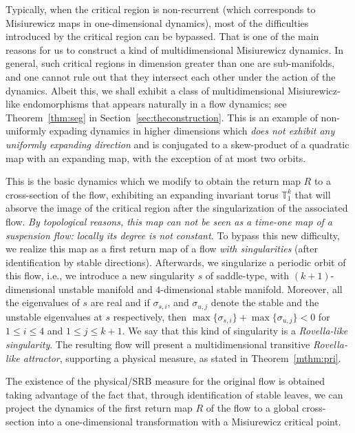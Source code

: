 \documentclass[reqno,12pt,a4paper]{amsart}
\theoremstyle{plain}
\theoremstyle{definition}
\begin{document}
Typically, when the critical region is non-recurrent (which
corresponds to Misiurewicz maps in one-dimensional
dynamics), most of the difficulties introduced by the
critical region can be bypassed. That is one of the main
reasons for us to construct a kind of multidimensional
Misiurewicz dynamics.  In general, such critical regions in
dimension greater than one are sub-manifolds, and one cannot
rule out that they intersect each other under the action of
the dynamics.  Albeit this, we shall exhibit a class of
multidimensional Misiurewicz-like endomorphisms that appears
naturally in a flow dynamics; see Theorem~\ref{thm:seg} in
Section~\ref{sec:theconstruction}. This is an example of
non-uniformly expading dynamics in higher dimensions which
\emph{does not exhibit any uniformly expanding direction}
and is conjugated to a skew-product of a quadratic map with
an expanding map, with the exception of at most two orbits.

This is the basic dynamics which we modify to obtain the
return map $R$ to a cross-section of the flow, exhibiting an
expanding invariant torus ${\mathbb{T}}_1^k$ that will absorve the
image of the critical region after the singularization of
the associated flow.  \emph{By topological reasons, this map
  can not be seen as a time-one map of a suspension flow:
  locally its degree is not constant.}  To bypass this new
difficulty, we realize this map as a first return map of a
flow \emph{with singularities} (after identification by
stable directions).  Afterwards, we singularize a periodic
orbit of this flow, i.e., we introduce a new singularity $s$
of saddle-type, with $(k+1)$-dimensional unstable manifold
and $4$-dimensional stable manifold. Moreover, all the
eigenvalues of $s$ are real and if $\sigma_{s,i}$, and
$\sigma_{u,j}$ denote the stable and the unstable
eigenvalues at $s$ respectively, then $\max\{\sigma_{s,i}\}
+ \max\{\sigma_{u,j}\} < 0$ for $1\le i \le 4$ and $1 \le j
\le k+1$.  We say that this kind of singularity is a {\emph
  {Rovella-like singularity}}.  The resulting flow will
present a multidimensional transitive \emph{Rovella-like
  attractor}, supporting a physical measure, as stated in
Theorem~\ref{mthm:pri}.

The existence of the physical/SRB measure for the original
flow is obtained taking advantage of the fact that, through
identification of stable leaves, we can project the dynamics
of the first return map $R$ of the flow to a global
cross-section into a one-dimensional transformation with a
Misiurewicz critical point.
\end{document}
